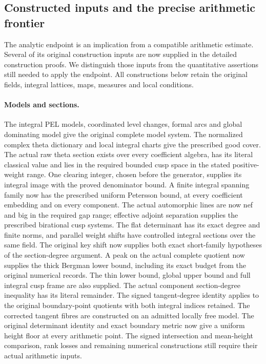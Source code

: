 \subsection{Constructed inputs and the precise arithmetic frontier}
\label{shared-current-arithmetic-frontier}

The analytic endpoint is an implication from a compatible arithmetic
estimate. Several of its original construction inputs are now supplied
in the detailed construction proofs\cite{current-construction-record}.
We distinguish those inputs from the quantitative assertions still
needed to apply the endpoint. All constructions below retain the
original fields, integral lattices, maps, measures and local conditions.

\paragraph{Models and sections.}
The integral PEL models, coordinated level changes, formal arcs and
global dominating model give the original complete model system.
The normalized complex theta dictionary and local integral charts give
the prescribed good cover. The actual raw theta section exists over
every coefficient algebra, has its literal classical value and lies in
the required bounded cusp space in the stated positive-weight range.
One clearing integer, chosen before the generator, supplies its
integral image with the proved denominator bound. A finite integral
spanning family now has the prescribed uniform Petersson bound, at
every coefficient embedding and on every component. The actual automorphic lines
are now nef and big in the required gap range; effective adjoint
separation supplies the prescribed birational cusp systems. The
flat determinant has its exact degree and finite norms, and parallel
weight shifts have controlled integral sections over the same field.
The original key shift now supplies both exact short-family hypotheses
of the section-degree argument. A peak on the actual complete quotient
now supplies the thick Bergman lower bound, including its exact budget
from the original numerical records. The thin lower bound, global upper
bound and full integral cusp frame are also supplied. The actual
component section-degree inequality has its literal remainder. The
signed tangent-degree identity applies to the original boundary-point
quotients with both integral indices retained. The corrected tangent
fibres are constructed on an admitted locally free model. The original
determinant identity and exact boundary metric now give a uniform
height floor at every arithmetic point. The signed intersection and
mean-height comparison, rank losses and remaining numerical
constructions still require their actual arithmetic inputs.

